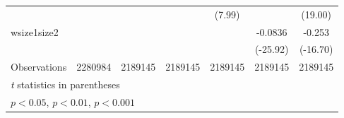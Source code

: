{\begin{tabular}{l*{6}{c}}
                    &                     &                     &                     &      (7.99)         &                     &     (19.00)         \\
[1em]
wsize1size2         &                     &                     &                     &                     &     -0.0836\sym{***}&      -0.253\sym{***}\\
                    &                     &                     &                     &                     &    (-25.92)         &    (-16.70)         \\
\hline
Observations        &     2280984         &     2189145         &     2189145         &     2189145         &     2189145         &     2189145         \\
\hline\hline
\multicolumn{7}{l}{\footnotesize \textit{t} statistics in parentheses}\\
\multicolumn{7}{l}{\footnotesize \sym{*} \(p<0.05\), \sym{**} \(p<0.01\), \sym{***} \(p<0.001\)}\\
\end{tabular}
}

